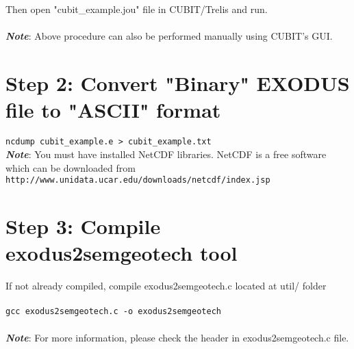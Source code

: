 \colorbox{gray}{
\parbox{16cm}{
}}
\\
\\
Then open "cubit\_example.jou" file in CUBIT/Trelis and run.\\
\\
\textbf{\emph{Note}}: Above procedure can also be performed manually using CUBIT's GUI.

\section*{Step 2: Convert "Binary" EXODUS file to "ASCII" format}
\texttt{ncdump cubit\_example.e > cubit\_example.txt}\\

\textbf{\emph{Note}}: You must have installed NetCDF libraries. NetCDF is a free software which can be downloaded from
\texttt{http://www.unidata.ucar.edu/downloads/netcdf/index.jsp}

\section*{Step 3: Compile exodus2semgeotech tool}
If not already compiled, compile exodus2semgeotech.c located at util/ folder\\
\\
\texttt{gcc exodus2semgeotech.c -o exodus2semgeotech}
\\
\\
\textbf{\emph{Note}}: For more information, please check the header in exodus2semgeotech.c file.

